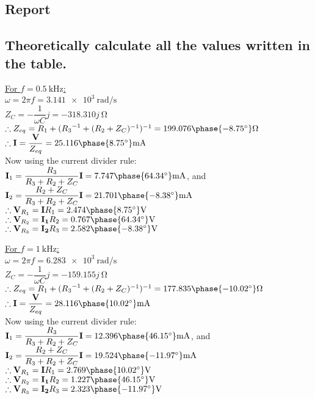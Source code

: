 \documentclass[12pt]{article}
\begin{document}
\begin{large}
	\section{Report}
	\subsection{Theoretically calculate all the values written in the table.}
	{
		\underline{For $ f = \SI{0.5}{\kilo\hertz} $:}\\
		$ \omega = 2 \pi f = \SI{3.141e3}{\radian\per\s} $\\
		$ Z_C = - \dfrac{1}{\omega C} j = -318.310 j \SI{}{\ohm} $\\
		$ \therefore Z_{eq} = R_1 + ({R_3}^{-1} + (R_2 + Z_C)^{-1})^{-1} = 199.076\phase{-8.75^\circ} \SI{}{\ohm} $\\
		$ \therefore \mathbf{I} = \dfrac{\mathbf{V}}{Z_{eq}} = 25.116\phase{8.75^\circ} \SI{}{\milli\A} $\\
		Now using the current divider rule:\\
		$ \mathbf{I}_1 = \dfrac{R_3}{R_3 + R_2 + Z_C} \mathbf{I} = 7.747\phase{64.34^\circ} \SI{}{\milli\A} $, and\\
		$ \mathbf{I}_2 = \dfrac{R_2 + Z_C}{R_3 + R_2 + Z_C} \mathbf{I} = 21.701\phase{-8.38^\circ} \SI{}{\milli\A} $\\
		$ \therefore \mathbf{V}_{R_1} = \mathbf{I} R_1 = 2.474\phase{8.75^\circ} \SI{}{\V} $\\
		$ \therefore \mathbf{V}_{R_2} = \mathbf{I_1} R_2 = 0.767\phase{64.34^\circ} \SI{}{\V} $\\
		$ \therefore \mathbf{V}_{R_3} = \mathbf{I_2} R_3 = 2.582\phase{-8.38^\circ} \SI{}{\V} $

		\vspace{20pt}
		\underline{For $ f = \SI{1}{\kilo\hertz} $:}\\
		$ \omega = 2 \pi f = \SI{6.283e3}{\radian\per\s} $\\
		$ Z_C = - \dfrac{1}{\omega C} j = -159.155 j \SI{}{\ohm} $\\
		$ \therefore Z_{eq} = R_1 + ({R_3}^{-1} + (R_2 + Z_C)^{-1})^{-1} = 177.835\phase{-10.02^\circ} \SI{}{\ohm} $\\
		$ \therefore \mathbf{I} = \dfrac{\mathbf{V}}{Z_{eq}} = 28.116\phase{10.02^\circ} \SI{}{\milli\A} $\\
		Now using the current divider rule:\\
		$ \mathbf{I}_1 = \dfrac{R_3}{R_3 + R_2 + Z_C} \mathbf{I} = 12.396\phase{46.15^\circ} \SI{}{\milli\A} $, and\\
		$ \mathbf{I}_2 = \dfrac{R_2 + Z_C}{R_3 + R_2 + Z_C} \mathbf{I} = 19.524\phase{-11.97^\circ} \SI{}{\milli\A} $\\
		$ \therefore \mathbf{V}_{R_1} = \mathbf{I} R_1 = 2.769\phase{10.02^\circ} \SI{}{\V} $\\
		$ \therefore \mathbf{V}_{R_2} = \mathbf{I_1} R_2 = 1.227\phase{46.15^\circ} \SI{}{\V} $\\
		$ \therefore \mathbf{V}_{R_3} = \mathbf{I_2} R_3 = 2.323\phase{-11.97^\circ} \SI{}{\V} $

}
\end{large}
\end{document}
